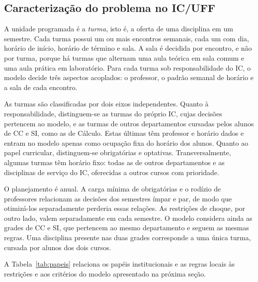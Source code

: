 \subsection{Caracterização do problema no IC/UFF}
\label{subsec:problema}

A unidade programada é a \textit{turma}, isto é, a oferta de uma disciplina em um semestre. Cada turma possui um ou mais encontros semanais, cada um com dia, horário de início, horário de término e sala. A sala é decidida por encontro, e não por turma, porque há turmas que alternam uma aula teórica em sala comum e uma aula prática em laboratório. Para cada turma sob responsabilidade do IC, o modelo decide três aspectos acoplados: o professor, o padrão semanal de horário e a sala de cada encontro.

As turmas são classificadas por dois eixos independentes. Quanto à responsabilidade, distinguem-se as turmas do próprio IC, cujas decisões pertencem ao modelo, e as turmas de outros departamentos cursadas pelos alunos de CC e SI, como as de Cálculo. Estas últimas têm professor e horário dados e entram no modelo apenas como ocupação fixa do horário dos alunos. Quanto ao papel curricular, distinguem-se obrigatórias e optativas. Transversalmente, algumas turmas têm horário fixo: todas as de outros departamentos e as disciplinas de serviço do IC, oferecidas a outros cursos com prioridade.

O planejamento é anual. A carga mínima de obrigatórias e o rodízio de professores relacionam as decisões dos semestres ímpar e par, de modo que otimizá-los separadamente perderia essas relações. As restrições de choque, por outro lado, valem separadamente em cada semestre. O modelo considera ainda as grades de CC e SI, que pertencem ao mesmo departamento e seguem as mesmas regras. Uma disciplina presente nas duas grades corresponde a uma única turma, cursada por alunos dos dois cursos.

A Tabela~\ref{tab:papeis} relaciona os papéis institucionais e as regras locais às restrições e aos critérios do modelo apresentado na próxima seção.

